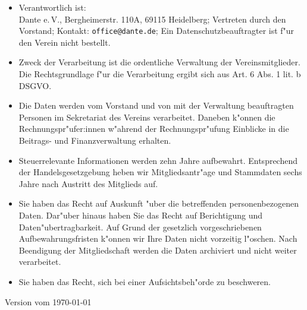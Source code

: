 \documentclass[12pt,ngerman,parskip]{scrartcl}
\begin{document}
\begin{spacing}{1.2}
\begin{tcolorbox}
[sharp corners=all,
title={\Large Informationen zum Datenschutz
entsprechend Art. 13 DSGVO}]
\begin{itemize}[nosep]
\item Verantwortlich ist:\\
Dante e.\,V., Bergheimerstr. 110A, 69115 Heidelberg;
Vertreten durch den Vorstand; Kontakt:
\mbox{\texttt{office@dante.de}}; Ein
Datenschutzbeauftragter ist f"ur den Verein nicht bestellt.
\item Zweck der Verarbeitung ist die ordentliche Verwaltung der
Vereinsmitglieder. Die Rechtsgrundlage f"ur die Verarbeitung
ergibt sich aus Art. 6 Abs. 1 lit. b DSGVO.
\item Die Daten werden vom Vorstand und von mit der Verwaltung
beauftragten Personen im Sekretariat des Vereins
verarbeitet. Daneben k"onnen die
Rechnungspr"ufer:innen w"ahrend der Rechnungspr"ufung Einblicke in
die Beitrags- und Finanzverwaltung erhalten.
\item
Steuerrelevante Informationen werden zehn Jahre aufbewahrt.
Entsprechend der Handelsgesetzgebung heben wir
Mitgliedsantr"age und Stammdaten sechs Jahre nach Austritt
des Mitglieds auf.
\item
Sie haben das Recht auf Auskunft "uber die betreffenden
personenbezogenen Daten. Dar"uber hinaus haben Sie das Recht
auf Berichtigung und Daten"ubertragbarkeit. Auf Grund der
gesetzlich vorgeschriebenen Aufbewahrungsfristen k"onnen wir
Ihre Daten nicht vorzeitig l"oschen. Nach Beendigung der
Mitgliedschaft werden die Daten archiviert und nicht weiter
verarbeitet.
\item
Sie haben das Recht, sich bei einer Aufsichtsbeh"orde zu
beschweren.
\end{itemize}
\end{tcolorbox}
\end{spacing}

\vfill
\tiny
Version vom \today
\end{document}
